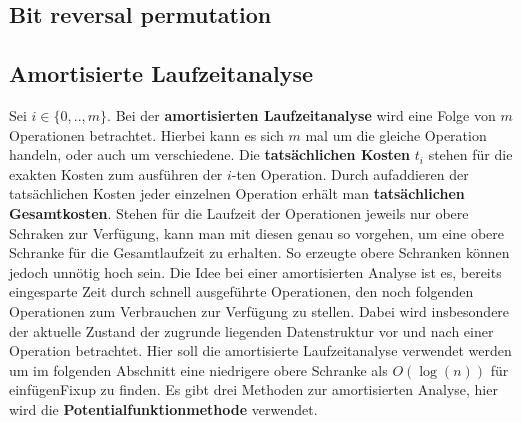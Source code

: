 \documentclass[a4paper,12pt]{article}
\begin{document}
\subsection{Bit reversal permutation }










\subsection{Amortisierte Laufzeitanalyse}
Sei $i \in \{0,..,m\}$. Bei der \textbf{amortisierten Laufzeitanalyse} wird eine Folge von $m$ Operationen betrachtet. Hierbei kann es sich $m$ mal um die gleiche Operation handeln, oder auch um verschiedene. Die \textbf{tatsächlichen Kosten}  $t_i$ stehen für die exakten Kosten zum ausführen der $i$-ten Operation. Durch aufaddieren der tatsächlichen Kosten jeder einzelnen Operation erhält man \textbf{tatsächlichen Gesamtkosten}.  Stehen für die Laufzeit der Operationen jeweils nur obere Schraken zur Verfügung, kann man mit diesen genau so vorgehen, um eine obere Schranke für die Gesamtlaufzeit zu erhalten. So erzeugte obere Schranken können jedoch unnötig hoch sein. Die Idee bei einer amortisierten Analyse ist es, bereits eingesparte Zeit durch schnell ausgeführte Operationen, den noch folgenden Operationen zum Verbrauchen zur Verfügung zu stellen.  Dabei wird insbesondere der aktuelle Zustand der zugrunde liegenden Datenstruktur vor und nach einer Operation betrachtet. Hier soll die amortisierte Laufzeitanalyse verwendet werden um im folgenden Abschnitt eine niedrigere obere Schranke als $O(\log(n))$ für einfügenFixup zu finden. Es gibt drei Methoden zur amortisierten Analyse, hier wird die \textbf{Potentialfunktionmethode} verwendet.
\end{document}
